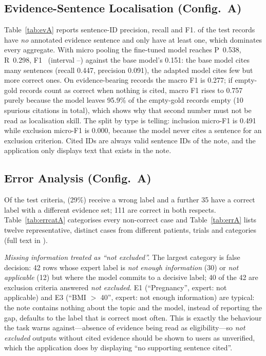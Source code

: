 \subsection{Evidence-Sentence Localisation (Config.~A)}
Table~\ref{tab:evA} reports sentence-ID precision, recall and F1. \NGoldEmpty{} of the \NTest{} test records have \emph{no} annotated evidence sentence and only \NGoldNon{} have at least one, which dominates every aggregate. With micro pooling the fine-tuned model reaches P~0.538, R~0.298, F1~\GTestEvF{} (interval \GTestEvFLo--\GTestEvFHi) against the base model's 0.151: the base model cites many sentences (recall 0.447, precision 0.091), the adapted model cites few but more correct ones. On evidence-bearing records the macro F1 is 0.277; if empty-gold records count as correct when nothing is cited, macro F1 rises to 0.757 purely because the model leaves 95.9\% of the empty-gold records empty (10 spurious citations in total), which shows why that second number must not be read as localisation skill. The split by type is telling: inclusion micro-F1 is 0.491 while exclusion micro-F1 is 0.000, because the model never cites a sentence for an exclusion criterion. Cited IDs are always valid sentence IDs of the note, and the application only displays text that exists in the note.

\begin{table}[t]\centering\caption{Config.~A evidence-sentence metrics on the test split (micro, and macro over evidence-bearing or all records).}\label{tab:evA}
\footnotesize\setlength{\tabcolsep}{3pt}\resizebox{\columnwidth}{!}{}\end{table}

\subsection{Error Analysis (Config.~A)}
\label{sec:errors}
Of the \NTest{} test criteria, \GNLabelErr{} (29\%) receive a wrong label and a further 35 have a correct label with a different evidence set; 111 are correct in both respects. Table~\ref{tab:errcatA} categorises every non-correct case and Table~\ref{tab:errA} lists twelve representative, distinct cases from different patients, trials and categories (full text in ).

\emph{Missing information treated as ``not excluded''.} The largest category is false decision: 42 rows whose expert label is \emph{not enough information} (30) or \emph{not applicable} (12) but where the model commits to a decisive label; 40 of the 42 are exclusion criteria answered \emph{not excluded}. E1 (``Pregnancy'', expert: not applicable) and E3 (``BMI $>$ 40'', expert: not enough information) are typical: the note contains nothing about the topic and the model, instead of reporting the gap, defaults to the label that is correct most often. This is exactly the behaviour the task warns against---absence of evidence being read as eligibility---so \emph{not excluded} outputs without cited evidence should be shown to users as unverified, which the application does by displaying ``no supporting sentence cited''.

